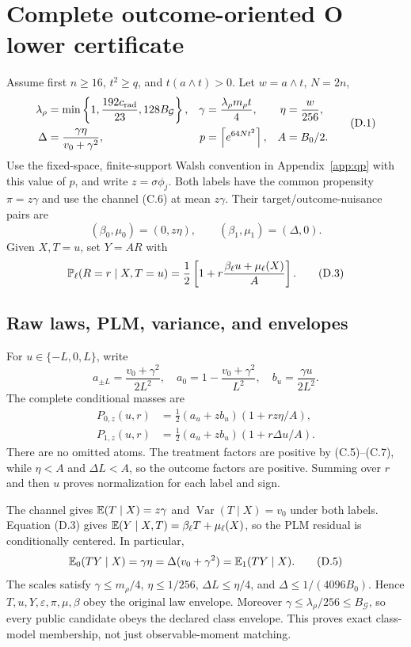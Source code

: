 \section{Complete outcome-oriented O lower certificate}
\label{app:o}

Assume first \(n\ge16\), \(t^2\ge q\), and \(t(a\wedge t)>0\).
Let \(w=a\wedge t\), \(N=2n\),
\[
\begin{aligned}
 \lambda_\rho&=\min\left\{1,\frac{192c_{\rm rad}}{23},
                         128B_{\mathcal G}\right\},&
 \gamma&=\frac{\lambda_\rho m_\rho t}{4},&
 \eta&=\frac w{256},\\
 \Delta&=\frac{\gamma\eta}{v_0+\gamma^2},&
 p&=\left\lceil e^{64Nt^2}\right\rceil,& A&=B_0/2.
\end{aligned}
 \tag{D.1}
\]
Use the fixed-space, finite-support Walsh convention in Appendix~\ref{app:qp}
with this value of \(p\), and write \(z=\sigma\phi_j\).  Both labels have the common
propensity \(\pi=z\gamma\) and use the channel (C.6) at mean \(z\gamma\).
Their target/outcome-nuisance pairs are
\[
 (\beta_0,\mu_0)=(0,z\eta),\qquad
 (\beta_1,\mu_1)=(\Delta,0).
 \tag{D.2}
\]
Given \(X,T=u\), set \(Y=AR\) with
\[
 \mathbb P_\ell(R=r\mid X,T=u)
 =\frac12\left[1+r\frac{\beta_\ell u+\mu_\ell(X)}A\right].
 \tag{D.3}
\]

\subsection{Raw laws, PLM, variance, and envelopes}

For \(u\in\{-L,0,L\}\), write
\[
 a_{\pm L}=\frac{v_0+\gamma^2}{2L^2},\quad
 a_0=1-\frac{v_0+\gamma^2}{L^2},\quad
 b_u=\frac{\gamma u}{2L^2}.
\]
The complete conditional masses are
\begin{align}
 P_{0,z}(u,r)&=\tfrac12(a_u+zb_u)(1+rz\eta/A),\nonumber\\
 P_{1,z}(u,r)&=\tfrac12(a_u+zb_u)(1+r\Delta u/A).
 \tag{D.4}
\end{align}
There are no omitted atoms.  The treatment factors are positive by
(C.5)--(C.7), while \(\eta<A\) and \(\Delta L<A\), so the outcome factors
are positive.  Summing over \(r\) and then \(u\) proves normalization for
each label and sign.

The channel gives \(\mathbb E(T\mid X)=z\gamma\) and
\(\operatorname{Var}(T\mid X)=v_0\) under both labels.  Equation (D.3)
gives \(\mathbb E(Y\mid X,T)=\beta_\ell T+\mu_\ell(X)\), so the PLM residual is
conditionally centered.  In particular,
\[
 \mathbb E_0(TY\mid X)=\gamma\eta
 =\Delta(v_0+\gamma^2)=\mathbb E_1(TY\mid X).
 \tag{D.5}
\]
The scales satisfy
\(\gamma\le m_\rho/4\), \(\eta\le1/256\),
\(\Delta L\le\eta/4\), and
\(\Delta\le1/(4096B_0)\).  Hence \(T,u,Y,\varepsilon,\pi,\mu,\beta\) obey
the original law envelope.  Moreover
\(\gamma\le\lambda_\rho/256\le B_{\mathcal G}\), so every public
candidate obeys the declared class envelope.  This proves exact
class-model membership, not just
observable-moment matching.

